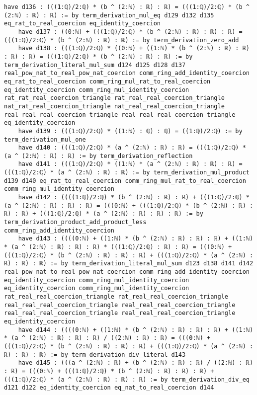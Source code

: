 \documentclass{article}
\begin{document}
\begin{tcolorbox}[colback=white!10, width=\linewidth]
\begin{lstlisting}[language=Lean4]
    have d136 : (((1:ℚ)/2:ℚ) * (b ^ (2:ℕ) : ℝ) : ℝ) = (((1:ℚ)/2:ℚ) * (b ^ (2:ℕ) : ℝ) : ℝ) := by term_derivation_mul_eq d129 d132 d135 eq_rat_to_real_coercion eq_identity_coercion
    have d137 : ((0:ℕ) + (((1:ℚ)/2:ℚ) * (b ^ (2:ℕ) : ℝ) : ℝ) : ℝ) = (((1:ℚ)/2:ℚ) * (b ^ (2:ℕ) : ℝ) : ℝ) := by term_derivation_zero_add
    have d138 : (((1:ℚ)/2:ℚ) * ((0:ℕ) + ((1:ℕ) * (b ^ (2:ℕ) : ℝ) : ℝ) : ℝ) : ℝ) = (((1:ℚ)/2:ℚ) * (b ^ (2:ℕ) : ℝ) : ℝ) := by term_derivation_literal_mul_sum d124 d125 d128 d137 real_pow_nat_to_real_pow_nat_coercion comm_ring_add_identity_coercion eq_rat_to_real_coercion comm_ring_mul_rat_to_real_coercion eq_identity_coercion comm_ring_mul_identity_coercion rat_rat_real_coercion_triangle rat_real_real_coercion_triangle nat_rat_real_coercion_triangle nat_real_real_coercion_triangle real_real_real_coercion_triangle real_real_real_coercion_triangle eq_identity_coercion
    have d139 : (((1:ℚ)/2:ℚ) * ((1:ℕ) : ℚ) : ℚ) = ((1:ℚ)/2:ℚ) := by term_derivation_mul_one
    have d140 : (((1:ℚ)/2:ℚ) * (a ^ (2:ℕ) : ℝ) : ℝ) = (((1:ℚ)/2:ℚ) * (a ^ (2:ℕ) : ℝ) : ℝ) := by term_derivation_reflection
    have d141 : (((1:ℚ)/2:ℚ) * ((1:ℕ) * (a ^ (2:ℕ) : ℝ) : ℝ) : ℝ) = (((1:ℚ)/2:ℚ) * (a ^ (2:ℕ) : ℝ) : ℝ) := by term_derivation_mul_product d139 d140 eq_rat_to_real_coercion comm_ring_mul_rat_to_real_coercion comm_ring_mul_identity_coercion
    have d142 : ((((1:ℚ)/2:ℚ) * (b ^ (2:ℕ) : ℝ) : ℝ) + (((1:ℚ)/2:ℚ) * (a ^ (2:ℕ) : ℝ) : ℝ) : ℝ) = (((0:ℕ) + (((1:ℚ)/2:ℚ) * (b ^ (2:ℕ) : ℝ) : ℝ) : ℝ) + (((1:ℚ)/2:ℚ) * (a ^ (2:ℕ) : ℝ) : ℝ) : ℝ) := by term_derivation_product_add_product_less comm_ring_add_identity_coercion
    have d143 : ((((0:ℕ) + ((1:ℕ) * (b ^ (2:ℕ) : ℝ) : ℝ) : ℝ) + ((1:ℕ) * (a ^ (2:ℕ) : ℝ) : ℝ) : ℝ) * (((1:ℚ)/2:ℚ) : ℝ) : ℝ) = (((0:ℕ) + (((1:ℚ)/2:ℚ) * (b ^ (2:ℕ) : ℝ) : ℝ) : ℝ) + (((1:ℚ)/2:ℚ) * (a ^ (2:ℕ) : ℝ) : ℝ) : ℝ) := by term_derivation_literal_mul_sum d123 d138 d141 d142 real_pow_nat_to_real_pow_nat_coercion comm_ring_add_identity_coercion eq_identity_coercion comm_ring_mul_identity_coercion eq_identity_coercion comm_ring_mul_identity_coercion rat_real_real_coercion_triangle rat_real_real_coercion_triangle real_real_real_coercion_triangle real_real_real_coercion_triangle real_real_real_coercion_triangle real_real_real_coercion_triangle eq_identity_coercion
    have d144 : ((((0:ℕ) + ((1:ℕ) * (b ^ (2:ℕ) : ℝ) : ℝ) : ℝ) + ((1:ℕ) * (a ^ (2:ℕ) : ℝ) : ℝ) : ℝ) / ((2:ℕ) : ℝ) : ℝ) = (((0:ℕ) + (((1:ℚ)/2:ℚ) * (b ^ (2:ℕ) : ℝ) : ℝ) : ℝ) + (((1:ℚ)/2:ℚ) * (a ^ (2:ℕ) : ℝ) : ℝ) : ℝ) := by term_derivation_div_literal d143
    have d145 : (((a ^ (2:ℕ) : ℝ) + (b ^ (2:ℕ) : ℝ) : ℝ) / ((2:ℕ) : ℝ) : ℝ) = (((0:ℕ) + (((1:ℚ)/2:ℚ) * (b ^ (2:ℕ) : ℝ) : ℝ) : ℝ) + (((1:ℚ)/2:ℚ) * (a ^ (2:ℕ) : ℝ) : ℝ) : ℝ) := by term_derivation_div_eq d121 d122 eq_identity_coercion eq_nat_to_real_coercion d144

\end{lstlisting}
\end{tcolorbox}
\end{document}
